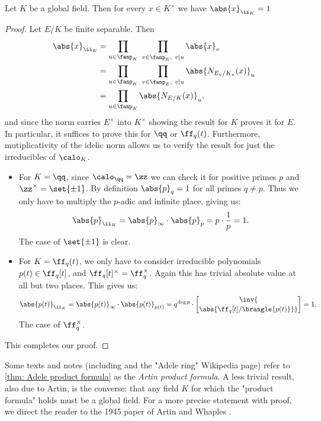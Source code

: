 \documentclass[11pt, x11names, openany]{book}
\begin{document}
\begin{theorem}
\label{thm: Adele product formula}
    Let $K$ be a global field. Then for every $x \in K^\times$ we have $\abs{x}_{\ii_K} = 1$
\end{theorem}
\begin{proof}
Let $E/K$ be finite separable. Then 
\begin{align*}
    \begin{split}
        \abs{x}_{\ii_E} &= \prod_{u \in \fanp_K} \ \prod_{v \in \fanp_E, \  v \mid u} \abs{x}_v\\
        &= \prod_{u \in \fanp_K} \ \prod_{v \in \fanp_E, \ v \mid u} \abs{N_{E_v/K_u}(x)}_u\\
        &= \prod_{u \in \fanp_K} \abs{N_{E/K}(x)}_u,
    \end{split}
\end{align*}
and since the norm carries $E^\times$ into $K^\times$ showing the result for $K$ proves it for $E$. In particular, it suffices to prove this for $\qq$ or $\ff_q(t)$. Furthermore, mutiplicativity of the idelic norm allows us to verify the result for just the irreducibles of $\calo_K$.
\begin{itemize}
    \item For $K = \qq$, since $\calo_\qq = \zz$ we can check it for positive primes $p$ and $\zz^\times = \set{\pm 1}$. By definition $\abs{p}_q = 1$ for all primes $q \neq p$. Thus we only have to multiply the $p$-adic and infinite place, giving us:
    \begin{equation*}
        \abs{p}_{\ii_K} = \abs{p}_\infty \cdot \abs{p}_p = p \cdot \frac{1}{p} = 1.
    \end{equation*}
    The case of $\set{\pm 1}$ is clear.
    \item For $K = \ff_q(t)$, we only have to consider irreducible polynomials $p(t) \in \ff_q[t]$, and $\ff_q[t]^\times = \ff_q^\times$. Again this has trivial absolute value at all but two places. This gives us:
    \begin{equation*}
        \abs{p(t)}_{\ii_K} = \abs{p(t)}_\infty \cdot \abs{p(t)}_{p(t)} = q^{\deg p} \cdot \inv{\brack{\abs{\ff_q[t]/ \brangle{p(t)}}}} = 1. 
    \end{equation*}
    The case of $\ff_q^\times$.
\end{itemize}
This completes our proof.
\end{proof}

\begin{remark}
    Some texts and notes (including \cite{ramakrishnan1998fourier} and the "Adele ring" Wikipedia page) refer to \ref{thm: Adele product formula} as the \textit{Artin product formula}. A less trivial result, also due to Artin, is the converse: that any field $K$ for which the "product formula" holds must be a global field. For a more precise statement with proof, we direct the reader to the 1945 paper of Artin and Whaples \cite{artin-whaples}.
\end{remark}
\end{document}
